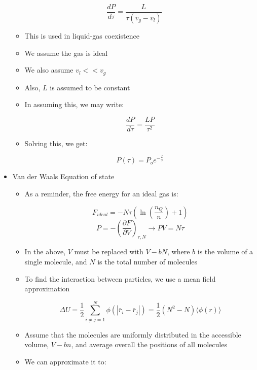 \begin{itemize}
    $$\frac{dP}{d\tau}=\frac{L}{\tau(v_g-v_l)}$$

    \begin{itemize}

      \item This is used in liquid-gas coexistence

      \item We assume the gas is ideal

      \item We also assume $v_l<<v_g$

      \item Also, $L$ is assumed to be constant

      \item In assuming this, we may write:

        $$\frac{dP}{d\tau}=\frac{LP}{\tau^2}$$

      \item Solving this, we get:

        $$P(\tau)=P_oe^{-\frac{L}{\tau}}$$

    \end{itemize}

  \item Van der Waals Equation of state

    \begin{itemize}

      \item As a reminder, the free energy for an ideal gas is:

        $$F_{ideal}=-N\tau\left( \ln\left( \frac{n_Q}{n} \right)+1 \right)$$
        $$P=-\left( \frac{\partial F}{\partial V} \right)_{\tau,N}\to PV=N\tau$$

      \item In the above, $V$ must be replaced with $V-bN$, where $b$ is the volume of a single molecule, and $N$ is the total number of molecules

      \item To find the interaction between particles, we use a mean field approximation

        $$\Delta U=\frac{1}{2}\sum_{i\neq j=1}^N\phi(|\bar{r}_i-\bar{r}_j|)=\frac{1}{2}(N^2-N)\langle\phi(r)\rangle$$

      \item Assume that the molecules are uniformly distributed in the accessible volume, $V-bn$, and average overall the positions of all molecules

      \item We can approximate it to:


\end{itemize}
\end{itemize}
